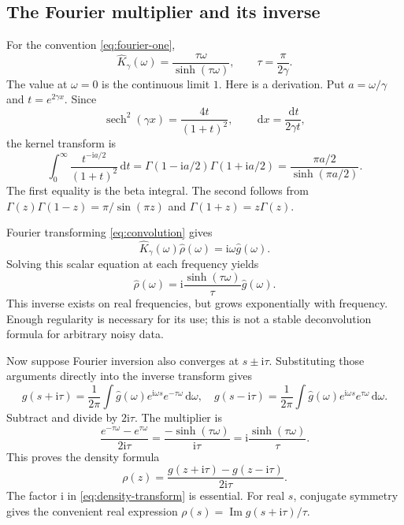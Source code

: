 \documentclass[11pt]{article}
\newcommand{\ii}{\mathrm i}
\newcommand{\dd}{\,\mathrm d}
\newcommand{\sech}{\operatorname{sech}}
\newcommand{\Imag}{\operatorname{Im}}
\begin{document}
\subsection{The Fourier multiplier and its inverse}

For the convention \eqref{eq:fourier-one},
\begin{equation}
 \widehat K_\gamma(\omega)=\frac{\tau\omega}{\sinh(\tau\omega)},
 \qquad \tau=\frac\pi{2\gamma}.
 \label{eq:kernel-transform}
\end{equation}
The value at $\omega=0$ is the continuous limit $1$. Here is a derivation. Put $a=\omega/\gamma$ and $t=e^{2\gamma x}$. Since
\[
 \sech^2(\gamma x)=\frac{4t}{(1+t)^2},\qquad
 \dd x=\frac{\dd t}{2\gamma t},
\]
the kernel transform is
\[
 \int_0^\infty\frac{t^{-\ii a/2}}{(1+t)^2}\dd t
 =\Gamma(1-\ii a/2)\Gamma(1+\ii a/2)
 =\frac{\pi a/2}{\sinh(\pi a/2)}.
\]
The first equality is the beta integral. The second follows from
$\Gamma(z)\Gamma(1-z)=\pi/\sin(\pi z)$ and $\Gamma(1+z)=z\Gamma(z)$.

Fourier transforming \eqref{eq:convolution} gives
\[
 \widehat K_\gamma(\omega)\widehat\rho(\omega)
 =\ii\omega\widehat g(\omega).
\]
Solving this scalar equation at each frequency yields
\begin{equation}
 \widehat\rho(\omega)=
 \ii\frac{\sinh(\tau\omega)}{\tau}\widehat g(\omega).
 \label{eq:density-transform}
\end{equation}
This inverse exists on real frequencies, but grows exponentially with frequency. Enough regularity is necessary for its use; this is not a stable deconvolution formula for arbitrary noisy data.

Now suppose Fourier inversion also converges at $s\pm\ii\tau$. Substituting those arguments directly into the inverse transform gives
\[
 g(s+\ii\tau)=\frac1{2\pi}\int\widehat g(\omega)e^{\ii\omega s}e^{-\tau\omega}\dd\omega,
 \quad
 g(s-\ii\tau)=\frac1{2\pi}\int\widehat g(\omega)e^{\ii\omega s}e^{\tau\omega}\dd\omega.
\]
Subtract and divide by $2\ii\tau$. The multiplier is
\[
 \frac{e^{-\tau\omega}-e^{\tau\omega}}{2\ii\tau}
 =\frac{-\sinh(\tau\omega)}{\ii\tau}
 =\ii\frac{\sinh(\tau\omega)}\tau.
\]
This proves the density formula
\begin{equation}
 \boxed{\rho(z)=\frac{g(z+\ii\tau)-g(z-\ii\tau)}{2\ii\tau}.}
 \label{eq:density}
\end{equation}
The factor $\ii$ in \eqref{eq:density-transform} is essential. For real $s$, conjugate symmetry gives the convenient real expression $\rho(s)=\Imag g(s+\ii\tau)/\tau$.
\end{document}
